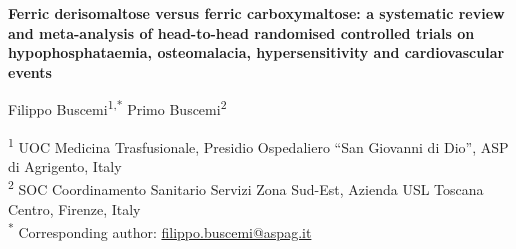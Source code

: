 \documentclass[11pt,a4paper]{article}
\begin{document}
\begin{center}
{\LARGE\bfseries Ferric derisomaltose versus ferric carboxymaltose: a systematic review and meta-analysis of head-to-head randomised controlled trials on hypophosphataemia, osteomalacia, hypersensitivity and cardiovascular events\par}
\vspace{1.2em}
{\large Filippo Buscemi\textsuperscript{1,*} \quad Primo Buscemi\textsuperscript{2}\par}
\vspace{0.8em}
{\small
\textsuperscript{1} UOC Medicina Trasfusionale, Presidio Ospedaliero ``San Giovanni di Dio'', ASP di Agrigento, Italy\\
\textsuperscript{2} SOC Coordinamento Sanitario Servizi Zona Sud-Est, Azienda USL Toscana Centro, Firenze, Italy\\
\textsuperscript{*} Corresponding author: \href{mailto:filippo.buscemi@aspag.it}{filippo.buscemi@aspag.it}\par}
\end{center}

\linenumbers
\end{document}
